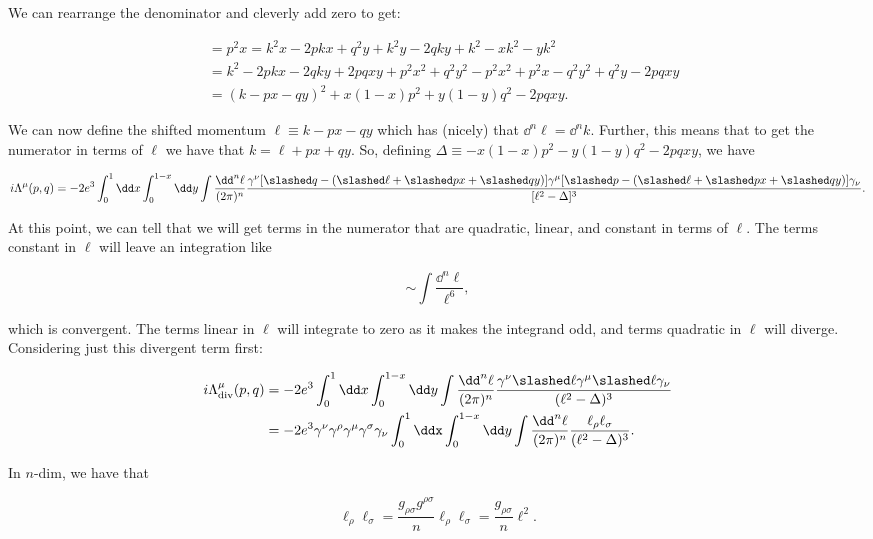 \documentclass[titlepage]{article}
\begin{document}
We can rearrange the denominator and cleverly add zero to get:

\begin{align}
    &= p^2x = k^2x - 2pkx + q^2y + k^2y - 2qky + k^2 - xk^2 - yk^2 \\
    &= k^2 - 2pkx - 2qky + 2pqxy + p^2x^2 + q^2y^2 - p^2x^2 + p^2x - q^2y^2 + q^2y - 2pqxy \\
    &= (k - px - qy)^2 + x(1-x)p^2 + y(1-y)q^2 - 2pqxy.
\end{align}

We can now define the shifted momentum $\ell \equiv k-px-qy$ which has (nicely) that $\dd^n\ell = \dd^nk$. Further, this means that to get the numerator in terms of $\ell$ we have that $k = \ell+px+qy$. So, defining $\Delta \equiv -x(1-x)p^2 - y(1-y)q^2 - 2pqxy$, we have

\begin{equation}
    i\Lambda^{\mu}(p,q) = -2e^3 \int_0^1 \dd x \int_0^{1-x} \dd y \int \frac{\dd^n\ell}{(2\pi)^n} \frac{\gamma^{\nu}[\qsl - (\lsl + \psl x + \qsl y)]\gamma^{\mu}[\psl - (\lsl + \psl x + \qsl y)]\gamma_{\nu}}{[\ell^2 - \Delta]^3}.
\end{equation}

At this point, we can tell that we will get terms in the numerator that are quadratic, linear, and constant in terms of $\ell$. The terms constant in $\ell$ will leave an integration like

\begin{equation}
    \sim \int \frac{\dd^n\ell}{\ell^6},
\end{equation}

which is convergent. The terms linear in $\ell$ will integrate to zero as it makes the integrand odd, and terms quadratic in $\ell$ will diverge. Considering just this divergent term first:

\begin{align}
    i\Lambda^{\mu}_{\mathrm{div}}(p,q) &= -2e^3 \int_0^1 \dd x \int_0^{1-x} \dd y \int \frac{\dd^n\ell}{(2\pi)^n} \frac{\gamma^{\nu}\lsl\gamma^{\mu}\lsl\gamma_{\nu}}{(\ell^2 - \Delta)^3} \\
    &= -2e^3 \gamma^{\nu}\gamma^{\rho}\gamma^{\mu}\gamma^{\sigma}\gamma_{\nu} \int_0^1 \ddx \int_0^{1-x} \dd y \int \frac{\dd^n\ell}{(2\pi)^n} \frac{\ell_{\rho}\ell_{\sigma}}{(\ell^2 - \Delta)^3}.
\end{align}


In $n$-dim, we have that

\begin{equation}
    \ell_{\rho}\ell_{\sigma} = \frac{g_{\rho\sigma}g^{\rho\sigma}}{n}\ell_{\rho}\ell_{\sigma} = \frac{g_{\rho\sigma}}{n}\ell^2.
\end{equation}
\end{document}
